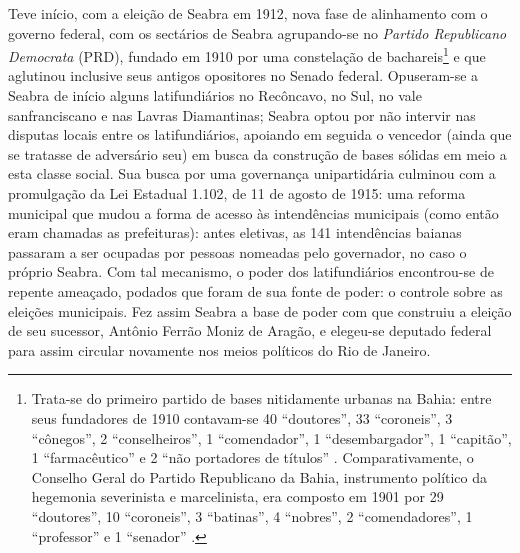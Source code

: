 Teve início, com a eleição de Seabra em 1912, nova fase de alinhamento com o governo federal, com os sectários de Seabra agrupando-se no \textit{Partido Republicano Democrata} (PRD), fundado em 1910 por uma constelação de bachareis\footnote{Trata-se do primeiro partido de bases nitidamente urbanas na Bahia: entre seus fundadores de 1910 contavam-se 40 ``doutores'', 33 ``coroneis'', 3 ``cônegos'', 2 ``conselheiros'', 1 ``comendador'', 1 ``desembargador'', 1 ``capitão'', 1 ``farmacêutico'' e 2 ``não portadores de títulos'' \cite[p.~70]{sampaio_partidos_1978}. Comparativamente, o Conselho Geral do Partido Republicano da Bahia, instrumento político da hegemonia severinista e marcelinista, era composto em 1901 por 29 ``doutores'', 10 ``coroneis'', 3 ``batinas'',  4 ``nobres'', 2 ``comendadores'', 1 ``professor'' e 1 ``senador'' \cite[p.~49]{sampaio_partidos_1978}.} e que aglutinou inclusive seus antigos opositores no Senado federal. Opuseram-se a Seabra de início alguns latifundiários no Recôncavo, no Sul, no vale sanfranciscano e nas Lavras Diamantinas; Seabra optou por não intervir nas disputas locais entre os latifundiários, apoiando em seguida o vencedor (ainda que se tratasse de adversário seu) em busca da construção de bases sólidas em meio a esta classe social. Sua busca por uma governança unipartidária culminou com a promulgação da Lei Estadual 1.102, de 11 de agosto de 1915: uma reforma municipal que mudou a forma de acesso às intendências municipais (como então eram chamadas as prefeituras): antes eletivas, as 141 intendências baianas passaram a ser ocupadas por pessoas nomeadas pelo governador, no caso o próprio Seabra. Com tal mecanismo, o poder dos latifundiários encontrou-se de repente ameaçado, podados que foram de sua fonte de poder: o controle sobre as eleições municipais. Fez assim Seabra a base de poder com que construiu a eleição de seu sucessor, Antônio Ferrão Moniz de Aragão, e elegeu-se deputado federal para assim circular novamente nos meios políticos do Rio de Janeiro. 


